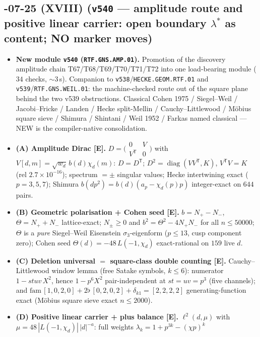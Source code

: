 \documentclass[11pt]{article}
\providecommand{\mE}{\textbf{[E]}}\providecommand{\mC}{\textbf{[C]}}
\begin{document}
\subsection*{-07-25 (XVIII) (\texttt{v540} --- amplitude route and positive linear carrier: open boundary $\lambda^*$ as content; NO marker moves)}
\begin{itemize}[leftmargin=1.5em]
\item \textbf{New module \texttt{v540} (\texttt{RTF.GNS.AMP.01}).} Promotion of the discovery
amplitude chain T67/T68/T69/T70/T71/T72 into one load-bearing module ($34$ checks, $\sim3$\,s).
Companion to \texttt{v538}/\texttt{HECKE.GEOM.RTF.01} and \texttt{v539}/\texttt{RTF.GNS.WEIL.01}:
the machine-checked route out of the square plane behind the two v539 obstructions.
Classical Cohen 1975 / Siegel--Weil / Jacobi--Fricke / Landen / Hecke split-Mellin /
Cauchy--Littlewood / M\"obius square sieve / Shimura / Shintani / Weil 1952 / Farkas named
classical --- NEW is the compiler-native consolidation.
\item \textbf{(A) Amplitude Dirac \mE.}
$D=\bigl(\begin{smallmatrix}0&V\\V^{\mathsf T}&0\end{smallmatrix}\bigr)$ with
$V[d,m]=\sqrt{w_d}\,b(d)\chi_d(m)$: $D=D^{\mathsf T}$;
$D^2=\operatorname{diag}(VV^{\mathsf T},K)$, $V^{\mathsf T}V=K$ (rel $2.7\times10^{-16}$);
spectrum $=\pm$ singular values; Hecke intertwining exact ($p=3,5,7$); Shimura
$b(dp^2)=b(d)(a_p-\chi_d(p)p)$ integer-exact on $644$ pairs.
\item \textbf{(B) Geometric polarisation + Cohen seed \mE.} $b=N_+-N_-$, $\Theta=N_++N_-$
lattice-exact; $N_\pm\ge0$ and $b^2=\Theta^2-4N_+N_-$ for all $n\le50000$; $\Theta$ is a
\emph{pure} Siegel--Weil Eisenstein $\sigma_3$-eigenform ($p\le13$, cusp component zero);
Cohen seed $\Theta(d)=-48\,L(-1,\chi_d)$ exact-rational on $159$ live $d$.
\item \textbf{(C) Deletion universal $=$ square-class double counting \mE.} Cauchy--Littlewood
window lemma (free Satake symbols, $k\le6$): numerator $1-stuv\,X^2$, hence $1-p^6X^2$
pair-independent at $st=uv=p^3$ (five channels); and
$\mathrm{fam}\,[1,0,2,0]+2\flat\,[0,2,0,2]+\delta_{k1}=[2,2,2,2]$ generating-function exact
(M\"obius square sieve exact $n\le2000$).
\item \textbf{(D) Positive linear carrier + plus balance \mE.} $\ell^2(d,\mu)$ with
$\mu=48\,|L(-1,\chi_d)|\,|d|^{-a}$: full weights $\lambda_k=1+p^{3k}-(\chi p)^k$

\end{itemize}
\end{document}
